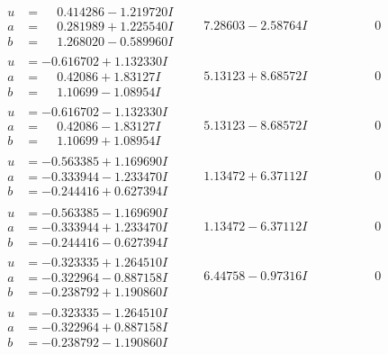 \documentclass[1p]{elsarticle_modified}
\theoremstyle{definition}
\begin{document}
$$\begin{array}{c|c|c}
\begin{aligned}
u &= \phantom{-}0.414286 - 1.219720 I \\
a &= \phantom{-}0.281989 + 1.225540 I \\
b &= \phantom{-}1.268020 - 0.589960 I\end{aligned}
 & \phantom{-}7.28603 - 2.58764 I & \phantom{-0.000000 } 0 \\ \hline\begin{aligned}
u &= -0.616702 + 1.132330 I \\
a &= \phantom{-}0.42086 + 1.83127 I \\
b &= \phantom{-}1.10699 - 1.08954 I\end{aligned}
 & \phantom{-}5.13123 + 8.68572 I & \phantom{-0.000000 } 0 \\ \hline\begin{aligned}
u &= -0.616702 - 1.132330 I \\
a &= \phantom{-}0.42086 - 1.83127 I \\
b &= \phantom{-}1.10699 + 1.08954 I\end{aligned}
 & \phantom{-}5.13123 - 8.68572 I & \phantom{-0.000000 } 0 \\ \hline\begin{aligned}
u &= -0.563385 + 1.169690 I \\
a &= -0.333944 - 1.233470 I \\
b &= -0.244416 + 0.627394 I\end{aligned}
 & \phantom{-}1.13472 + 6.37112 I & \phantom{-0.000000 } 0 \\ \hline\begin{aligned}
u &= -0.563385 - 1.169690 I \\
a &= -0.333944 + 1.233470 I \\
b &= -0.244416 - 0.627394 I\end{aligned}
 & \phantom{-}1.13472 - 6.37112 I & \phantom{-0.000000 } 0 \\ \hline\begin{aligned}
u &= -0.323335 + 1.264510 I \\
a &= -0.322964 - 0.887158 I \\
b &= -0.238792 + 1.190860 I\end{aligned}
 & \phantom{-}6.44758 - 0.97316 I & \phantom{-0.000000 } 0 \\ \hline\begin{aligned}
u &= -0.323335 - 1.264510 I \\
a &= -0.322964 + 0.887158 I \\
b &= -0.238792 - 1.190860 I\end{aligned}

\end{array}$$
\end{document}
